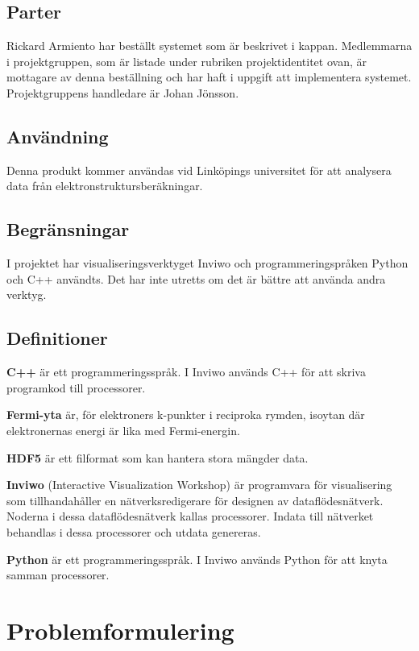 \documentclass[a4paper,12pt]{article}
\begin{document}
\subsection{Parter}
Rickard Armiento har beställt systemet som är beskrivet i kappan. Medlemmarna i projektgruppen, som är listade under rubriken projektidentitet ovan, är mottagare av denna beställning och har haft i uppgift att implementera systemet. Projektgruppens handledare är Johan Jönsson.


\subsection{Användning}
Denna produkt kommer användas vid Linköpings universitet för att analysera data från elektronstruktursberäkningar.

\subsection{Begränsningar}
I projektet har visualiseringsverktyget Inviwo och
programmeringspråken Python och C++ användts. Det har inte utretts
om det är bättre att använda andra verktyg.

\subsection{Definitioner}

\textbf{C++} är ett programmeringsspråk.
\cite{C++}
\newline
I Inviwo används C++ för att skriva programkod till
processorer.

\textbf{Fermi-yta} är, för elektroners k-punkter i reciproka rymden, isoytan där elektronernas energi är lika med Fermi-energin.
\cite{Fermi-yta}

\textbf{HDF5} är ett filformat som kan hantera stora mängder data.
\cite{hdf5}

\textbf{Inviwo} (Interactive Visualization Workshop) är programvara
för visualisering som tillhandahåller en nätverksredigerare för
designen av dataflödesnätverk. Noderna i dessa dataflödesnätverk
kallas processorer. Indata till nätverket behandlas i dessa
processorer och utdata genereras.
\cite{Inviwo}

\textbf{Python} är ett programmeringsspråk.
\cite{Python}
\newline
I Inviwo används Python för att knyta samman processorer.


\section{Problemformulering}
\label{ch:problemformulering}
\end{document}
